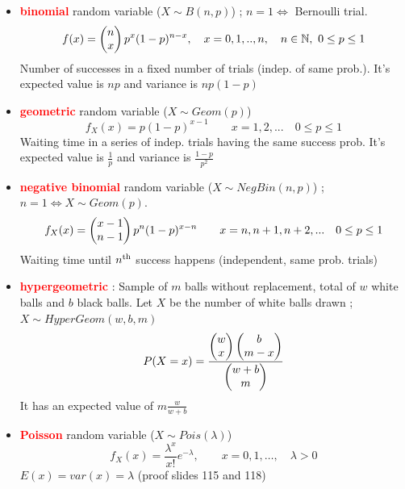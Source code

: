\documentclass[12pt,a4paper]{article}
\begin{document}
\begin{itemize}
    \item \textbf{\textcolor{red}{binomial}} random variable  ($X \sim B(n,p)$) ; $n =1 \iff$ Bernoulli trial.
            \begin{equation*}
                f(x) = \begin{pmatrix} n \\ x \end{pmatrix} p^x(1-p)^{n-x},\quad x = 0,1,..,n,\quad n \in \mathbb{N},\ 0\leq p \leq 1
            \end{equation*}
            Number of successes in a fixed number of trials (indep. of same prob.). It's expected value is $np$ and variance is $np(1-p)$
    \item \textbf{\textcolor{red}{geometric}} random variable ($X \sim Geom(p)$)
            \begin{equation}
                f_X(x) =p(1-p)^{x-1} \qquad x=1,2,... \quad 0 \leq p \leq 1
            \end{equation}
            Waiting time in a series of indep. trials having the same success prob. It's expected value is $\frac{1}{p}$ and variance is $\frac{1-p}{p^2}$
    \item \textbf{\textcolor{red}{negative binomial}} random variable ($X \sim NegBin(n,p)$) ; $n=1 \iff X \sim Geom(p)$.
            \begin{equation}
                f_X(x) = \begin{pmatrix} x-1 \\ n-1 \end{pmatrix}p^n(1-p)^{x-n} \qquad x = n, n+1, n+2,... \quad 0 \leq p \leq 1
                \label{equ:distribution_negative_binomial}
            \end{equation}
            Waiting time until $n\textsuperscript{th}$ success happens (independent, same prob. trials)
   \item \textbf{\textcolor{red}{hypergeometric}} : Sample of $m$ balls without replacement, total of $w$ white balls and $b$ black balls. Let $X$ be the number of white balls drawn ; $X \sim HyperGeom(w,b,m)$
            \begin{equation}
                P(X=x) = \frac{\begin{pmatrix} w \\ x \end{pmatrix}\begin{pmatrix} b \\ m-x \end{pmatrix}}{\begin{pmatrix} w+b \\ m \end{pmatrix}}
            \end{equation}
            It has an expected value of $m\frac{w}{w+b}$
    \item \textbf{\textcolor{red}{Poisson}} random variable ($X \sim Pois(\lambda)$)
    \begin{equation}
        f_X(x) = \frac{\lambda^x}{x!}e^{-\lambda},\qquad x = 0,1,\ldots,\quad \lambda > 0
    \end{equation}
    $E(x) = var(x) = \lambda$ (proof slides 115 and 118)
\end{itemize}
\end{document}
